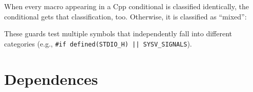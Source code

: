 \documentclass[10pt]{article}
\newcommand{\captionsmall}[1]{\caption[]{\small #1}}
\begin{document}
When every macro appearing in a Cpp conditional is classified identically,
the conditional gets that classification, too.  Otherwise, it is classified
as ``mixed'':

\begin{description}\itemsep 0pt \parskip 0pt
\item[Mixed categories] These guards test multiple symbols
      that independently fall into different categories (e.g.,
      {\tt \#if defined(\verb|STDIO_H|) || \verb|SYSV_SIGNALS|}).
\end{description}



% 
% 
% 



\section{Dependences}
\label{sec:dependence}
\label{sec:last-content-section}
\end{document}
